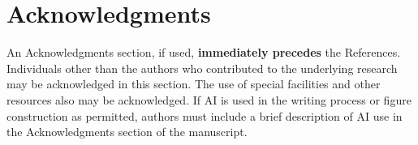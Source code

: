 \documentclass[journal ]{new-aiaa}
\begin{document}
\section*{Acknowledgments}
An Acknowledgments section, if used, \textbf{immediately precedes} the References. Individuals other than the authors who contributed to the underlying research may be acknowledged in this section. The use of special facilities and other resources also may be acknowledged. If AI is used in the writing process or figure construction as permitted, authors must include a brief description of AI use in the Acknowledgments section of the manuscript.


\end{document}
